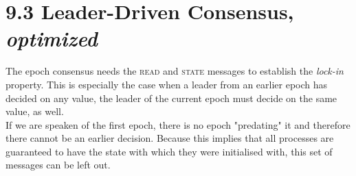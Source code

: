 \documentclass{article}
\begin{document}
	\section*{9.3 Leader-Driven Consensus, \textit{optimized}}
	\begin{adjustwidth}{2em}{2em}
		The epoch consensus needs the \textsc{read} and \textsc{state} messages to establish the \textit{lock-in} property. This is especially the case when a leader from an earlier epoch has decided on any value, the leader of the current epoch must decide on the same value, as well. \\
		If we are speaken of the first epoch, there is no epoch "predating" it and therefore there cannot be an earlier decision. Because this implies that all processes are guaranteed to have the state with which they were initialised with, this set of messages can be left out.
	\end{adjustwidth}
\end{document}
